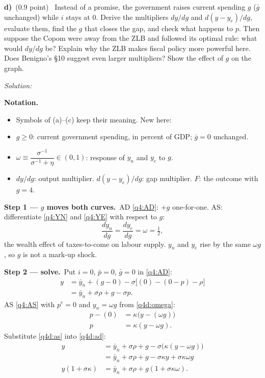 \documentclass[11pt,a4paper]{article}
\newif\ifsolucoes
\newcommand{\espacoresol}{6cm}
\newcommand{\parte}[2]{\par\Needspace{6\baselineskip}\medskip\noindent\textbf{#1)}~(#2)~}
\newcommand{\resolespaco}{\ifsolucoes\else\par\textit{Solution:}\vspace{\espacoresol}\par\fi}
\newcommand{\passo}[2]{\par\smallskip\noindent\textbf{Step #1.}~#2}
\newenvironment{notacao}{\par\smallskip\noindent\textbf{Notation.}\begin{itemize}[leftmargin=1.4em,topsep=1pt,itemsep=0pt]\small}{\end{itemize}}
\begin{document}
\parte{d}{0.9 point} Instead of a promise, the government raises current spending $g$ ($\bar g$ unchanged) while
$i$ stays at 0. Derive the multipliers $dy/dg$ and $d(y-y_e)/dg$, evaluate them, find the $g$ that closes the gap,
and check what happens to $p$. Then suppose the Copom were away from the ZLB and followed its optimal rule: what
would $dy/dg$ be? Explain why the ZLB makes fiscal policy more powerful here. Does Benigno's \S10 suggest even larger
multipliers? Show the effect of $g$ on the graph.
\resolespaco
\begin{sol}
\begin{notacao}
\item Symbols of (a)--(c) keep their meaning. New here:
\item $g\ge0$: current government spending, in percent of GDP; $\bar g=0$ unchanged.
\item $\omega\equiv\dfrac{\sigma^{-1}}{\sigma^{-1}+\eta}\in(0,1)$: response of $y_n$ and $y_e$ to $g$.
\item $dy/dg$: output multiplier. $d(y-y_e)/dg$: gap multiplier. $F$: the outcome with $g=4$.
\end{notacao}
\passo{1 --- $g$ moves both curves}{AD \eqref{q4:AD}: $+g$ one-for-one. AS: differentiate \eqref{q4:YN} and
\eqref{q4:YE} with respect to $g$:
\begin{equation}
\frac{dy_n}{dg}=\frac{dy_e}{dg}=\omega=\tfrac12, \label{q4d:omega}
\end{equation}
the wealth effect of taxes-to-come on labour supply. $y_n$ and $y_e$ rise by the same $\omega g$, so $g$ is not a
mark-up shock.}
\passo{2 --- solve}{Put $i=0$, $\bar p=0$, $\bar g=0$ in \eqref{q4:AD}:
\begin{align}
y &= \bar y_n+(g-0)-\sigma\big[(0)-(0-p)-\rho\big]\nonumber\\
&= \bar y_n+\sigma\rho+g-\sigma p. \label{q4d:ad}
\end{align}
AS \eqref{q4:AS} with $p^e=0$ and $y_n=\omega g$ from \eqref{q4d:omega}:
\begin{align}
p-(0) &= \kappa\big(y-(\omega g)\big)\nonumber\\
p &= \kappa(y-\omega g). \label{q4d:as}
\end{align}
Substitute \eqref{q4d:as} into \eqref{q4d:ad}:
\begin{align*}
y &= \bar y_n+\sigma\rho+g-\sigma\big(\kappa(y-\omega g)\big)\\
&= \bar y_n+\sigma\rho+g-\sigma\kappa y+\sigma\kappa\omega g\\
y(1+\sigma\kappa) &= \bar y_n+\sigma\rho+g(1+\sigma\kappa\omega).

\end{align*}}
\end{sol}
\end{document}
